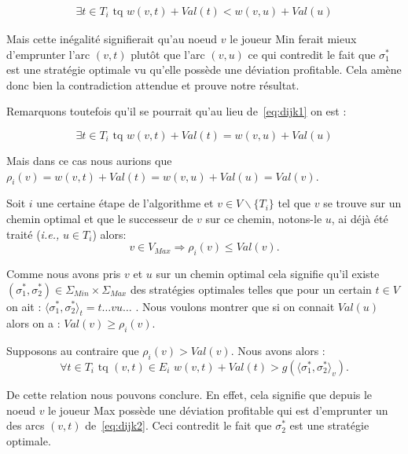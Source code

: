 \begin{demonstration}
\begin{align} \exists t \in T_i \text{ tq } w(v,t) + Val(t) < w(v,u) + Val(u) \label{eq:dijk1} \end{align}

Mais cette inégalité signifierait qu'au noeud $v$ le joueur Min ferait mieux d'emprunter l'arc $(v,t)$ plutôt que l'arc $(v,u)$ ce qui contredit le fait que $\sigma_1^*$ est une stratégie optimale vu qu'elle possède une déviation profitable. Cela amène donc bien la contradiction attendue et prouve notre résultat.

Remarquons toutefois qu'il se pourrait qu'au lieu de~\eqref{eq:dijk1} on est : 

$$ \exists t \in T_i \text{ tq } w(v,t) + Val(t) = w(v,u) + Val(u) $$

Mais dans ce cas nous aurions que $\rho_i(v)= w(v,t) + Val(t) = w(v,u) + Val(u) = Val(v)$. 

\end{demonstration}

\begin{propriete}
	\label{prop:dijk2}
	Soit $i$ une certaine étape de l'algorithme et $v \in V\backslash \{ T_i \}$ tel que $v$ se trouve sur un chemin optimal et que le successeur de $v$ sur ce chemin, notons-le $u$, ai déjà été traité (\emph{i.e.,} $u \in T_i$) alors:
	$$ v \in V_{Max} \Rightarrow \rho_i(v) \leq Val(v).$$
\end{propriete}

\begin{demonstration} 
	$\text{}$\\
	Comme nous avons pris $v$ et $u$ sur un chemin optimal cela signifie qu'il existe $(\sigma_1^*, \sigma_2^*) \in \Sigma_{Min} \times \Sigma_{Max}$ des stratégies optimales telles que pour un certain $t \in V$ on ait : $\langle \sigma_1^*, \sigma_2^* \rangle_t = t\ldots vu\ldots$ .
Nous voulons montrer que si on connait $Val(u)$ alors on a : $Val(v) \geq \rho_i(v)$.

Supposons au contraire que $ \rho_i(v) > Val(v)$. Nous avons alors : 
\begin{equation} \forall t \in T_i \text{ tq } (v,t)\in E_i \,\, w(v,t) + Val(t) > g(\langle \sigma_1^*, \sigma_2^*\rangle_v). \label{eq:dijk2}\end{equation}

De cette relation nous pouvons conclure. En effet, cela signifie que depuis le noeud $v$ le joueur Max possède une déviation profitable qui est d'emprunter un des arcs $(v,t)$ de~\eqref{eq:dijk2}. Ceci contredit le fait que $\sigma_2^*$ est une stratégie optimale.
	
\end{demonstration}

